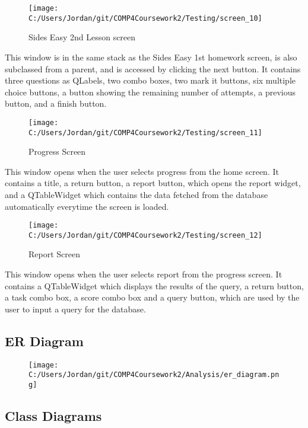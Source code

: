 \begin{figure}[H]
    \label{fig: Second Screen}\caption{Sides Easy 2nd Lesson screen}
    \texttt{[image: C:/Users/Jordan/git/COMP4Coursework2/Testing/screen\_10]}
\end{figure}

This window is in the same stack as the Sides Easy 1st homework screen, is also subclassed from a parent, and is accessed by clicking the next button. It contains three questions as QLabels, two combo boxes, two mark it buttons, six multiple choice buttons, a button showing the remaining number of attempts, a previous button, and a finish button.

\begin{figure}[H]
    \label{fig: Second Screen}\caption{Progress Screen}
    \texttt{[image: C:/Users/Jordan/git/COMP4Coursework2/Testing/screen\_11]}
\end{figure}

This window opens when the user selects progress from the home screen. It contains a title, a return button, a report button, which opens the report widget, and a QTableWidget which contains the data fetched from the database automatically everytime the screen is loaded.

\begin{figure}[H]
    \label{fig: Second Screen}\caption{Report Screen}
    \texttt{[image: C:/Users/Jordan/git/COMP4Coursework2/Testing/screen\_12]}
\end{figure}

This window opens when the user selects report from the progress screen. It contains a QTableWidget which displays the results of the query, a return button, a task combo box, a score combo box and a query button, which are used by the user to input a query for the database.

\subsection{ER Diagram}

\begin{figure}[H]
    \texttt{[image: C:/Users/Jordan/git/COMP4Coursework2/Analysis/er\_diagram.png]}
    \label{fig:print_function_result}
\end{figure}

\subsection{Class Diagrams}

